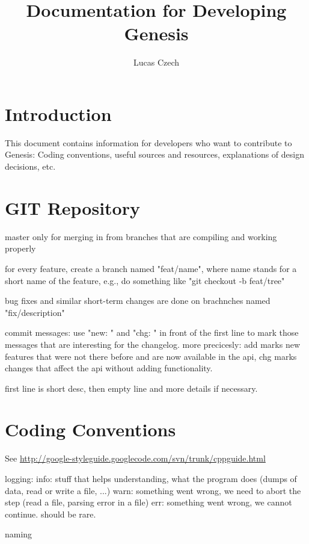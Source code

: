 \documentclass[a4paper,10pt]{article}
\title{Documentation for Developing Genesis}
\author{Lucas Czech}
\begin{document}
\maketitle

\section{Introduction}
\label{sec:Introduction}

This document contains information for developers who want to contribute to Genesis: Coding conventions, useful sources and resources, explanations of design decisions, etc.

\section{GIT Repository}
\label{sec:GitRepository}

master only for merging in from branches that are compiling and working properly

for every feature, create a branch named "feat/name", where name stands for a
short name of the feature, e.g., do something like "git checkout -b feat/tree"

bug fixes and similar short-term changes are done on brachnches named
"fix/description"

commit messages: use "new: " and "chg: " in front of the first line to mark
those messages that are interesting for the changelog.
more precicesly: add marks new features that were not there before and are now
available in the api, chg marks changes that affect the api without adding
functionality.

first line is short desc, then empty line and more details if necessary.

\section{Coding Conventions}
\label{sec:CodingConventions}

See \href{http://google-styleguide.googlecode.com/svn/trunk/cppguide.html}{http://google-styleguide.googlecode.com/svn/trunk/cppguide.html}

logging:
info: stuff that helps understanding, what the program does (dumps of data, read or write a file, ...)
warn: something went wrong, we need to abort the step (read a file, parsing error in a file)
err:  something went wrong, we cannot continue. should be rare.

naming
\end{document}
